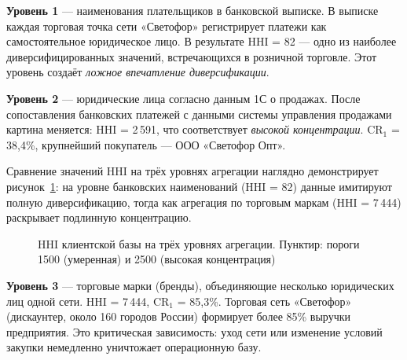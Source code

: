 \textbf{Уровень 1} --- наименования плательщиков в банковской выписке. В выписке каждая торговая точка сети «Светофор» регистрирует платежи как самостоятельное юридическое лицо. В результате HHI = 82 --- одно из наиболее диверсифицированных значений, встречающихся в розничной торговле. Этот уровень создаёт \textit{ложное впечатление диверсификации}.

\textbf{Уровень 2} --- юридические лица согласно данным 1С о продажах. После сопоставления банковских платежей с данными системы управления продажами картина меняется: HHI = 2\,591, что соответствует \textit{высокой концентрации}. CR$_1$ = 38,4\%, крупнейший покупатель --- ООО «Светофор Опт».

Сравнение значений HHI на трёх уровнях агрегации наглядно демонстрирует рисунок~\ref{fig:hhi_chart}: на уровне банковских наименований (HHI = 82) данные имитируют полную диверсификацию, тогда как агрегация по торговым маркам (HHI = 7\,444) раскрывает подлинную концентрацию.

\begin{figure}[H]
\centering
{}
\caption{HHI клиентской базы на трёх уровнях агрегации. Пунктир: пороги 1500 (умеренная) и 2500 (высокая концентрация)}
\label{fig:hhi_chart}
\end{figure}

\textbf{Уровень 3} --- торговые марки (бренды), объединяющие несколько юридических лиц одной сети. HHI = 7\,444, CR$_1$ = 85,3\%. Торговая сеть «Светофор» (дискаунтер, около 160 городов России) формирует более 85\% выручки предприятия. Это критическая зависимость: уход сети или изменение условий закупки немедленно уничтожает операционную базу.

